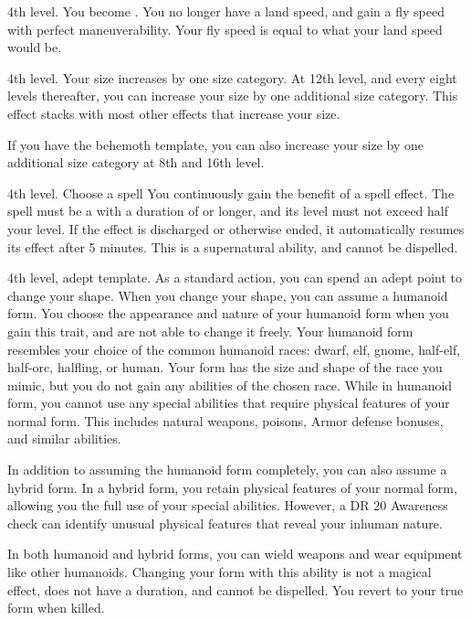     \featpre 4th level.
    \featben You become .
    You no longer have a land speed, and gain a fly speed with perfect maneuverability.
    Your fly speed is equal to what your land speed would be.

    \featpre 4th level.
    \featben Your size increases by one size category.
    At 12th level, and every eight levels thereafter, you can increase your size by one additional size category.
    This effect stacks with most other effects that increase your size.

    If you have the behemoth template, you can also increase your size by one additional size category at 8th and 16th level.

    \featpre 4th level.
     Choose a spell
    \featben You continuously gain the benefit of a spell effect.
    The spell must be a  with a duration of \durshort or longer, and its level must not exceed half your level.
    If the effect is discharged or otherwise ended, it automatically resumes its effect after 5 minutes.
    This is a supernatural ability, and cannot be dispelled.

    \featpre 4th level, adept template.
    \featben As a standard action, you can spend an adept point to change your shape.
    When you change your shape, you can assume a humanoid form.
    You choose the appearance and nature of your humanoid form when you gain this trait, and are not able to change it freely.
    Your humanoid form resembles your choice of the common humanoid races: dwarf, elf, gnome, half-elf, half-orc, halfling, or human.
    Your form has the size and shape of the race you mimic, but you do not gain any abilities of the chosen race.
    While in humanoid form, you cannot use any special abilities that require physical features of your normal form.
    This includes natural weapons, poisons, Armor defense bonuses, and similar abilities.

    In addition to assuming the humanoid form completely, you can also assume a hybrid form.
    In a hybrid form, you retain physical features of your normal form, allowing you the full use of your special abilities.
    However, a DR 20 Awareness check can identify unusual physical features that reveal your inhuman nature.

    In both humanoid and hybrid forms, you can wield weapons and wear equipment like other humanoids.
    Changing your form with this ability is not a magical effect, does not have a duration, and cannot be dispelled.
    You revert to your true form when killed.

